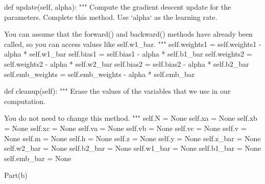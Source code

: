 \documentclass[12pt]{article}
\begin{document}
\begin{python}
    def update(self, alpha):
        """
        Compute the gradient descent update for the parameters.
        Complete this method. Use `alpha` as the learning rate.

        You can assume that the forward() and backward() methods have already
        been called, so you can access values like self.w1_bar.
        """
        self.weights1 = self.weights1 - alpha * self.w1_bar
        self.bias1 = self.bias1 - alpha * self.b1_bar
        self.weights2 = self.weights2 - alpha * self.w2_bar
        self.bias2 = self.bias2 - alpha * self.b2_bar
        self.emb_weights = self.emb_weights - alpha * self.emb_bar

    def cleanup(self):
        """
        Erase the values of the variables that we use in our computation.
       
        You do not need to change this method.
        """
        self.N = None
        self.xa = None
        self.xb = None
        self.xc = None
        self.va = None
        self.vb = None
        self.vc = None
        self.v = None
        self.m = None
        self.h = None
        self.z = None
        self.y = None
        self.z_bar = None
        self.w2_bar = None
        self.b2_bar = None
        self.w1_bar = None
        self.b1_bar = None
        self.emb_bar = None
\end{python}
 Part(b)\\
\end{document}
